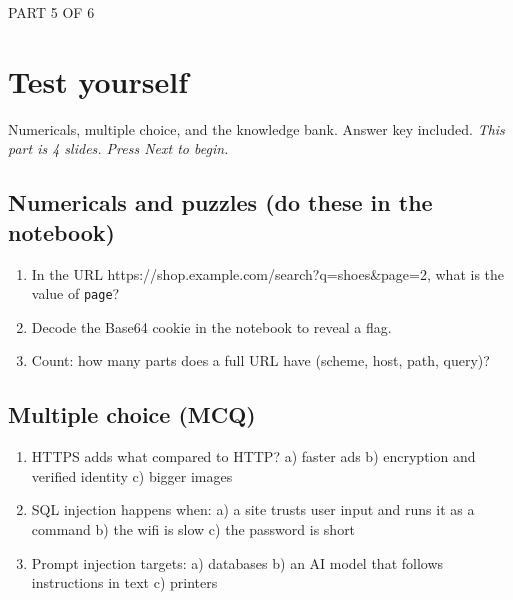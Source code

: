 \documentclass[12pt,openany]{book}
\begin{document}
\medskip

\vspace{4pt}\noindent\textsc{PART 5 OF 6}


\section*{Test yourself}

Numericals, multiple choice, and the knowledge bank. Answer key included.
{\small\itshape\color{gray}This part is 4 slides. Press Next to begin.}

\medskip

\subsection*{Numericals and puzzles (do these in the notebook)}


\begin{enumerate}

  \item In the URL https://shop.example.com/search?q=shoes\&page=2, what is the value of \texttt{page}?

  \item Decode the Base64 cookie in the notebook to reveal a flag.

  \item Count: how many parts does a full URL have (scheme, host, path, query)?

\end{enumerate}

\medskip

\subsection*{Multiple choice (MCQ)}


\begin{enumerate}

  \item HTTPS adds what compared to HTTP?
   a) faster ads  b) encryption and verified identity  c) bigger images

  \item SQL injection happens when:
   a) a site trusts user input and runs it as a command  b) the wifi is slow  c) the password is short

  \item Prompt injection targets:
   a) databases  b) an AI model that follows instructions in text  c) printers

\end{enumerate}
\end{document}
